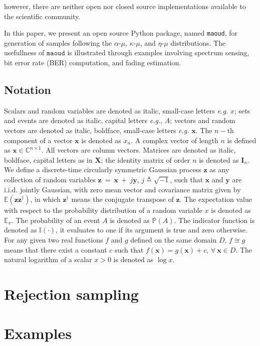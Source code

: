 \documentclass[conference, 10pt]{IEEEtran}
\begin{document}
however, there are neither open nor
closed source implementations available to the scientific community.

In this paper, we present an open source Python package, named \texttt{maoud},
for generation of samples following the $\alpha\text{-}\mu$, $\kappa\text{-}\mu$, and
$\eta\text{-}\mu$ distributions. The usefullness of $\texttt{maoud}$ is illustrated
through examples involving spectrum sensing, bit error rate (BER) computation, and
fading estimation.

\subsection*{Notation}
Scalars and random variables are denoted as italic, small-case letters
\textit{e.g.} $x$; sets and events are denoted as italic, capital
letters \textit{e.g.}, $A$; vectors and random vectors are denoted as
italic, boldface, small-case letters \textit{e.g.} $\bm{x}$. The $n-$th
component of a vector $\bm{x}$ is denoted as $x_n$. A complex vector of length
$n$ is defined as $\bm{x} \in \mathbb{C}^{n\times 1}$. All vectors are column
vectors. Matrices are denoted as italic, boldface, capital letters as
in $\bm{X}$; the identity matrix of order $n$ is denoted as $\bm{I}_n$. We
define a discrete-time circularly symmetric Gaussian process $\bm{z}$ as any
collection of random variables $\bm{z}~=~\bm{x}~+~j\bm{y}$,
$j \triangleq \sqrt{-1}$, such that $\bm{x}$ and $\bm{y}$ are i.i.d. jointly
Gaussian, with zero mean vector and covariance matrix given by
$\mathbb{E}\left(\bm{z}\bm{z}^{\dagger}\right)$, in which $\bm{z}^\dagger$ means
the conjugate transpose of $\bm{z}$. The expectation value with respect to the
probability distribution of a random variable $x$ is denoted as $\mathbb{E}_x$.
The probability of an event $A$ is denoted as $\mathbb{P}(A)$. The indicator
function is denoted as $\mathbb{I}(\cdot)$, it evaluates to one if its argument
is true and zero otherwise. For any given two real functions $f$ and $g$ defined
on the same domain $D$, $f \cong g$ means that there exist a constant $c$ such that
$f(\bm{x}) = g(\bm{x}) + c$, $\forall~ \bm{x} \in D$. The natural logarithm of a
scalar $x > 0$ is denoted as $\log x$.

\section{Rejection sampling}

\section{Examples}
\end{document}
